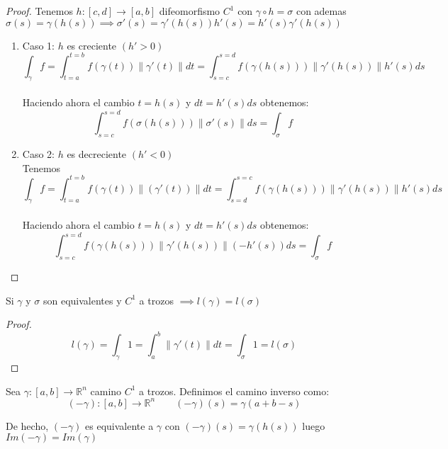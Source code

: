 \begin{proof}
    Tenemos $h:[c,d] \to [a,b]$ difeomorfismo $C^1$ con $\gamma \circ h = \sigma$ con ademas $\sigma(s) = \gamma(h(s)) \implies \sigma'(s) = \gamma'(h(s))h'(s)=h'(s)\gamma'(h(s))$
    \begin{enumerate}
        \item Caso 1: $h$ es creciente $(h'>0)$ \\ $$\int_{\gamma} f = \int_{t=a}^{t=b}
                  f(\gamma(t)) \lVert \gamma'(t) \rVert dt = \int_{s=c}^{s=d} f(\gamma(h(s)))
                  \lVert \gamma'(h(s)) \rVert h'(s)ds$$ \\ Haciendo ahora el cambio $t=h(s)$ y
              $dt=h'(s)ds$ obtenemos: $$\int_{s=c}^{s=d} f(\sigma(h(s))) \lVert \sigma'(s)
                  \rVert ds=\int_{\sigma}f$$
        \item Caso 2: $h$ es decreciente $(h'<0)$\\ Tenemos $$ \int_{\gamma} f=
                  \int_{t=a}^{t=b} f(\gamma(t)) \lVert (\gamma'(t)) \rVert
                  dt=\int_{s=d}^{s=c}f(\gamma(h(s))) \lVert \gamma'(h(s)) \rVert h'(s)ds$$ \\
              Haciendo ahora el cambio $t=h(s)$ y $dt=h'(s)ds$ obtenemos: $$\int_{s=c}^{s=d}
                  f(\gamma(h(s))) \lVert \gamma'(h(s)) \rVert (-h'(s))ds = \int_{\sigma}f$$
    \end{enumerate}
\end{proof}

\begin{corolario}
    Si $\gamma$ y $\sigma$ son equivalentes y $C^1$ a trozos $\implies l(\gamma)=l(\sigma)$
\end{corolario}

\begin{proof}
    $$l(\gamma) =\int_{\gamma}1=\int_{a}^{b} \lVert \gamma'(t) \rVert dt=\int_{\sigma}1=l(\sigma)$$
\end{proof}

\begin{definición}
Sea $\gamma:[a,b] \to \mathbb{R}^n$ camino $C^1$ a trozos. Definimos el camino inverso como:
$$(-\gamma):[a,b] \to \mathbb{R}^n \qquad (-\gamma)(s)=\gamma(a+b-s)$$
\end{definición}

\begin{observación}
De hecho, $(-\gamma)$ es equivalente a $\gamma$ con $(-\gamma)(s)=\gamma(h(s))$ luego $Im(-\gamma)=Im(\gamma)$
\end{observación}

